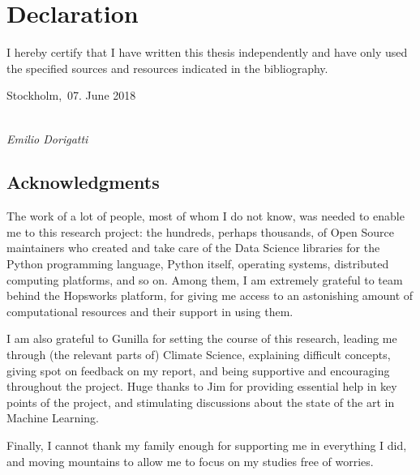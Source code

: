 \documentclass[a4paper,11pt]{kth-mag}
\begin{document}
\clearpage
\pagestyle{empty}

\chapter*{Declaration}

\vspace*{2cm}
\noindent

I hereby certify that I have written this thesis independently and have only used the specified sources and resources indicated in the bibliography.

\vspace{2cm}

\noindent
Stockholm,\, 07. June 2018 %

\vspace{3cm}

\hspace*{7cm}%
\dotfill\\
\hspace*{8.5cm}%
\textit{Emilio Dorigatti}
\newpage

\section*{Acknowledgments}
The work of a lot of people, most of whom I do not know, was needed to enable me to this research project: the hundreds, perhaps thousands, of Open Source maintainers who created and take care of the Data Science libraries for the Python programming language, 
Python itself, operating systems, distributed computing platforms, and so on. Among them, I am extremely grateful to team behind the Hopsworks platform, for giving me access to an astonishing amount of computational resources and their support in using them.

I am also grateful to Gunilla for setting the course of this research, leading me through (the relevant parts of) Climate Science, explaining difficult concepts, giving spot on feedback on my report, and being supportive and encouraging throughout the project. Huge thanks to Jim for providing essential help in key points of the project, and stimulating discussions about the state of the art in Machine Learning.

Finally, I cannot thank my family enough for supporting me in everything I did, and moving mountains to allow me to focus on my studies free of worries.
\clearpage

\tableofcontents*
\end{document}
